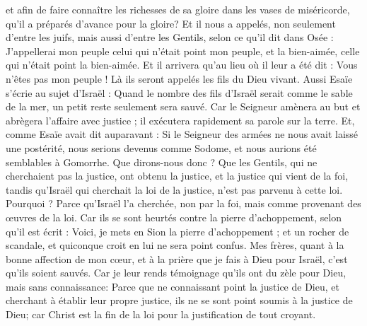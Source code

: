 \begin{multicols}{2}
et afin de faire connaître les richesses de sa gloire dans les vases de miséricorde, qu'il a préparés d'avance pour la gloire?
Et il nous a appelés, non seulement d'entre les juifs, mais aussi d'entre les Gentils,
selon ce qu'il dit dans Osée : J'appellerai mon peuple celui qui n'était point mon peuple, et la bien-aimée, celle qui n'était point la bien-aimée.
Et il arrivera qu'au lieu où il leur a été dit : Vous n'êtes pas mon peuple ! Là ils seront appelés les fils du Dieu vivant.
Aussi Esaïe s'écrie au sujet d'Israël : Quand le nombre des fils d'Israël serait comme le sable de la mer, un petit reste seulement sera sauvé.
Car le Seigneur amènera au but et abrègera l'affaire avec justice ; il exécutera rapidement sa parole sur la terre.
Et, comme Esaïe avait dit auparavant : Si le Seigneur des armées ne nous avait laissé une postérité, nous serions devenus comme Sodome, et nous aurions été semblables à Gomorrhe.
Que dirons-nous donc ? Que les Gentils, qui ne cherchaient pas la justice, ont obtenu la justice, et la justice qui vient de la foi,
tandis qu'Israël qui cherchait la loi de la justice, n'est pas parvenu à cette loi.
Pourquoi ? Parce qu'Israël l'a cherchée, non par la foi, mais comme provenant des œuvres de la loi. Car ils se sont heurtés contre la pierre d'achoppement,
selon qu'il est écrit : Voici, je mets en Sion la pierre d'achoppement ; et un rocher de scandale, et quiconque croit en lui ne sera point confus.
\VerseOne{}Mes frères, quant à la bonne affection de mon cœur, et à la prière que je fais à Dieu pour Israël, c'est qu'ils soient sauvés.
Car je leur rends témoignage qu'ils ont du zèle pour Dieu, mais sans connaissance:
Parce que ne connaissant point la justice de Dieu, et cherchant à établir leur propre justice, ils ne se sont point soumis à la justice de Dieu;
car Christ est la fin de la loi pour la justification de tout croyant.

\end{multicols}
